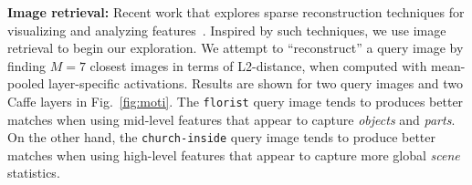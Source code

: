 \documentclass[10pt,twocolumn,letterpaper]{article}
\begin{document}
{\bf Image retrieval:} Recent work that explores sparse reconstruction techniques for visualizing and analyzing features~\cite{vondrick2013hoggles}. Inspired by such techniques, we use image retrieval to begin our exploration. We attempt to ``reconstruct'' a query image by finding $M=7$ closest images in terms of L2-distance, when computed with mean-pooled layer-specific activations. Results are shown for two query images and two Caffe layers in Fig.~\ref{fig:moti}. The {\tt florist} query image tends to produces better matches when using mid-level features that appear to capture \textit{objects} and \textit{parts}. On the other hand, the {\tt church-inside} query image tends to produce better matches when using high-level features that appear to capture more global \textit{scene} statistics.





\end{document}
